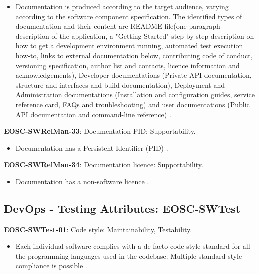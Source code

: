 \begin{itemize}
    \item Documentation is produced according to the target audience, varying according to the software component specification. The identified types of documentation and their content are README file(one-paragraph description of the application, a "Getting Started" step-by-step description on how to get a development environment running, automated test execution how-to, links to external documentation below, contributing code of conduct, versioning specification, author list and contacts, licence information and acknowledgements), Developer documentations (Private API documentation, structure and interfaces and build documentation), Deployment and Administration documentations (Installation and configuration guides, service reference card, FAQs and troubleshooting) and user documentations (Public API documentation and command-line reference) \cite{aberdour_achieving_2007,shepherdson_cessda_2019,orviz_set_2017,orviz_fernandez_eosc-synergy_2020,raymond_software_2013}.
\end{itemize}

\textbf{EOSC-SWRelMan-33}: Documentation PID: Supportability.

\begin{itemize}
    \item Documentation has a Persistent Identifier (PID) \cite{orviz_fernandez_eosc-synergy_2020}.
\end{itemize}

\textbf{EOSC-SWRelMan-34}: Documentation licence: Supportability.

\begin{itemize}
    \item Documentation has a non-software licence \cite{orviz_fernandez_eosc-synergy_2020}.
\end{itemize}

\subsection{DevOps - Testing Attributes: EOSC-SWTest}

\textbf{EOSC-SWTest-01}: Code style: Maintainability, Testability.

\begin{itemize}
    \item Each individual software complies with a de-facto code style standard for all the programming languages used in the codebase. Multiple standard style compliance is possible \cite{orviz_set_2017,raymond_software_2013}.
\end{itemize}

